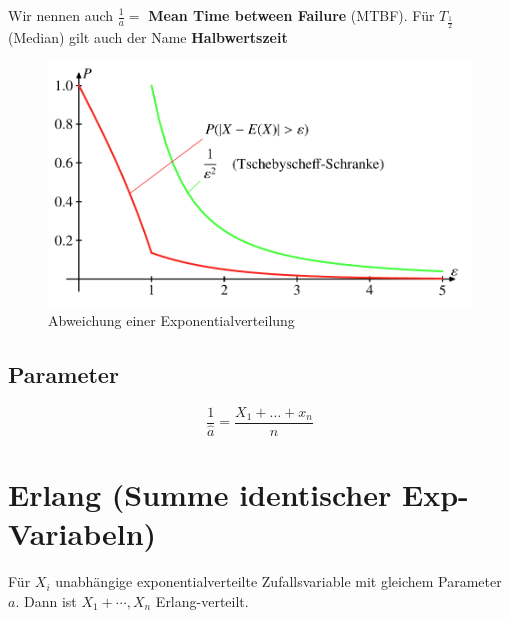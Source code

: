 \documentclass[../Main.tex]{subfiles}
\begin{document}

Wir nennen auch \(\frac{1}{a} = \) \textbf{Mean Time between Failure} (MTBF).
Für \(T_{\frac{1}{2}}\) (Median) gilt auch der Name \textbf{Halbwertszeit}

\begin{figure}[H]
    \centering
    \includegraphics[width=0.75\linewidth]{Images/exp-abweichung.png}
    \caption{Abweichung einer Exponentialverteilung}
\end{figure}


\subsection{Parameter}
\begin{equation}
    \frac{1}{\hat{a}} = \frac{X_1 + \dots + x_n}{n} 
\end{equation}

\newpage

\section{Erlang (Summe identischer Exp-Variabeln)}
Für \(X_i\) unabhängige exponentialverteilte
Zufallsvariable mit gleichem Parameter \(a\).
Dann ist \(X_1+\cdots,X_n\) Erlang-verteilt.
\end{document}
